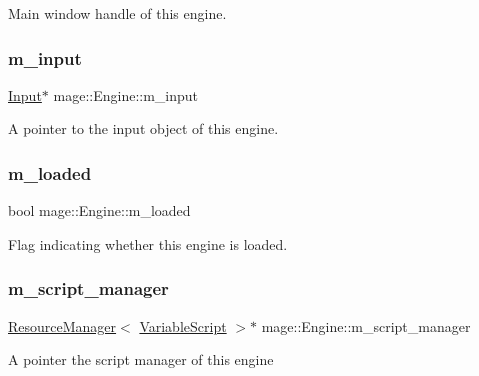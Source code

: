 Main window handle of this engine. \hypertarget{classmage_1_1_engine_a432ac639c593fd0fb8cede2463fe10c2}{}\label{classmage_1_1_engine_a432ac639c593fd0fb8cede2463fe10c2} 
\subsubsection{\texorpdfstring{m\+\_\+input}{m\_input}}
{\footnotesize\ttfamily \hyperlink{classmage_1_1_input}{Input}$\ast$ mage\+::\+Engine\+::m\+\_\+input\hspace{0.3cm}{\ttfamily [private]}}

A pointer to the input object of this engine. \hypertarget{classmage_1_1_engine_a2f8783761b9629dd507d0a6bc456125b}{}\label{classmage_1_1_engine_a2f8783761b9629dd507d0a6bc456125b} 
\subsubsection{\texorpdfstring{m\+\_\+loaded}{m\_loaded}}
{\footnotesize\ttfamily bool mage\+::\+Engine\+::m\+\_\+loaded\hspace{0.3cm}{\ttfamily [private]}}

Flag indicating whether this engine is loaded. \hypertarget{classmage_1_1_engine_a4faf1b8f94a84be27dd63054bf6fe36d}{}\label{classmage_1_1_engine_a4faf1b8f94a84be27dd63054bf6fe36d} 
\subsubsection{\texorpdfstring{m\+\_\+script\+\_\+manager}{m\_script\_manager}}
{\footnotesize\ttfamily \hyperlink{classmage_1_1_resource_manager}{Resource\+Manager}$<$ \hyperlink{classmage_1_1_variable_script}{Variable\+Script} $>$$\ast$ mage\+::\+Engine\+::m\+\_\+script\+\_\+manager\hspace{0.3cm}{\ttfamily [private]}}

A pointer the script manager of this engine \hypertarget{classmage_1_1_engine_a825715684015ac2a43cfc5b6bf3b083f}{}\label{classmage_1_1_engine_a825715684015ac2a43cfc5b6bf3b083f} 
